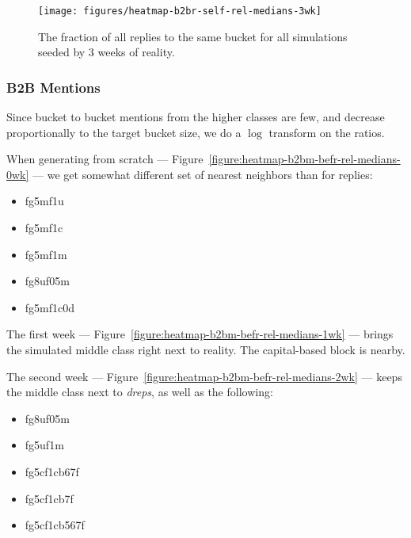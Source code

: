 \documentclass[10pt,oneside]{memoir}
\begin{document}
\begin{figure}
\begin{center}
    \texttt{[image: figures/heatmap-b2br-self-rel-medians-3wk]}
    \caption{The fraction of all replies to the same bucket for all simulations seeded by 3 weeks of reality.}
    \label{figure:heatmap-b2br-self-rel-medians-3wk}
\end{center}
\end{figure}
\pagebreak \subsubsection{B2B Mentions}
\label{b2bmentions}

Since bucket to bucket mentions from the higher classes are few, and decrease proportionally to the target bucket size, we do a $\log$ transform on the ratios.


When generating from scratch --- Figure~\ref{figure:heatmap-b2bm-befr-rel-medians-0wk} --- we get somewhat different set of nearest neighbors than for replies:


\begin{itemize}


\item fg5mf1u

\item fg5mf1c

\item fg5mf1m

\item fg8uf05m

\item fg5mf1c0d
\end{itemize}

The first week --- Figure~\ref{figure:heatmap-b2bm-befr-rel-medians-1wk} ---   brings the simulated middle class right next to reality.  The capital-based block is nearby.


The second week --- Figure~\ref{figure:heatmap-b2bm-befr-rel-medians-2wk} ---  keeps the middle class next to {\itshape dreps}, as well as the following:


\begin{itemize}


\item fg8uf05m

\item fg5uf1m

\item fg5cf1cb67f

\item fg5cf1cb7f

\item fg5cf1cb567f
\end{itemize}
\end{document}
